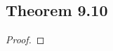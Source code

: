 \documentclass[../../main.tex]{subfiles}
\begin{document}
\subsection{Theorem 9.10}
\begin{wts}

\end{wts}
\begin{proof}

\end{proof}
\end{document}
